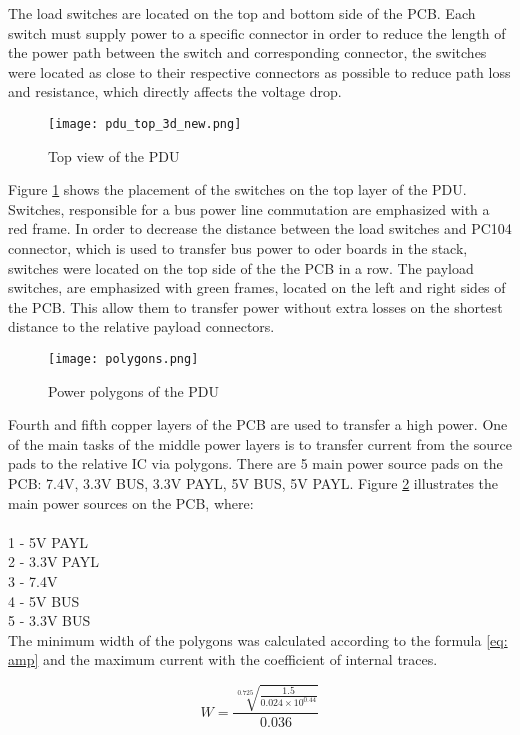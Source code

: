 The load switches are located on the top and bottom side of the PCB. Each switch must supply power to a specific connector in order to reduce the length of the power path between the switch and  corresponding connector, the switches were located as close to their respective connectors as possible to reduce path loss and resistance, which directly affects the voltage drop. 

\begin{figure}[h]
	\centering
	\texttt{[image: pdu\_top\_3d\_new.png]}
	\caption{Top view of the PDU}
	\label{fig: toppducon}
\end{figure} 

Figure \ref{fig: toppducon} shows the placement of the switches on the top layer of the PDU. Switches, responsible for a bus power line commutation are emphasized with a red frame. In order to decrease the distance between the load switches and PC104 connector, which is used to transfer bus power to oder boards in the stack, switches were located on the top side of the the PCB in a row. The payload switches, are emphasized with green frames, located on the left and right sides of the PCB. This allow them to transfer power without extra losses on the shortest distance to the relative payload connectors.

\begin{figure}[h]
	\centering
	\texttt{[image: polygons.png]}
	\caption{Power polygons of the PDU}
	\label{fig: poly}
\end{figure} 

Fourth and fifth copper layers of the PCB are used to transfer a high power. One of the main tasks of the middle power layers is to transfer current from the source pads to the relative IC via polygons. There are 5 main power source pads on the PCB: 7.4V, 3.3V BUS, 3.3V PAYL, 5V BUS, 5V PAYL. Figure \ref{fig: poly} illustrates the main power sources on the PCB, where:\\ \\
 1 - 5V PAYL\\
 2 - 3.3V PAYL\\
 3 - 7.4V\\
 4 - 5V BUS\\
 5  - 3.3V BUS\\

The minimum width of the polygons was calculated according to the formula \ref{eq: amp} and the maximum current with the coefficient of internal traces.

\begin{equation}
W = \frac{\sqrt[0.725]{\frac{1.5}{0.024 \times 10^{0.44}}}}{0.036}
\end{equation} 

